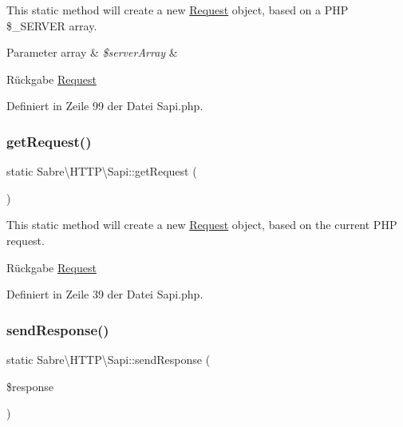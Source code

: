 This static method will create a new \mbox{\hyperlink{class_sabre_1_1_h_t_t_p_1_1_request}{Request}} object, based on a P\+HP \$\+\_\+\+S\+E\+R\+V\+ER array.


\begin{DoxyParams}[1]{Parameter}
array & {\em \$server\+Array} & \\
\hline
\end{DoxyParams}
\begin{DoxyReturn}{Rückgabe}
\mbox{\hyperlink{class_sabre_1_1_h_t_t_p_1_1_request}{Request}} 
\end{DoxyReturn}


Definiert in Zeile 99 der Datei Sapi.\+php.

\mbox{\label{class_sabre_1_1_h_t_t_p_1_1_sapi_a9a6f473099bc96ae72e657cb161ee6f1}} 
\subsubsection{\texorpdfstring{get\+Request()}{getRequest()}}
{\footnotesize\ttfamily static Sabre\textbackslash{}\+H\+T\+T\+P\textbackslash{}\+Sapi\+::get\+Request (\begin{DoxyParamCaption}{ }\end{DoxyParamCaption})\hspace{0.3cm}{\ttfamily [static]}}

This static method will create a new \mbox{\hyperlink{class_sabre_1_1_h_t_t_p_1_1_request}{Request}} object, based on the current P\+HP request.

\begin{DoxyReturn}{Rückgabe}
\mbox{\hyperlink{class_sabre_1_1_h_t_t_p_1_1_request}{Request}} 
\end{DoxyReturn}


Definiert in Zeile 39 der Datei Sapi.\+php.

\mbox{\label{class_sabre_1_1_h_t_t_p_1_1_sapi_a7cce278b850e1864015eb19ac77d6a49}} 
\subsubsection{\texorpdfstring{send\+Response()}{sendResponse()}}
{\footnotesize\ttfamily static Sabre\textbackslash{}\+H\+T\+T\+P\textbackslash{}\+Sapi\+::send\+Response (\begin{DoxyParamCaption}\item[{\mbox{\hyperlink{interface_sabre_1_1_h_t_t_p_1_1_response_interface}{Response\+Interface}}}]{\$response }\end{DoxyParamCaption})\hspace{0.3cm}{\ttfamily [static]}}

